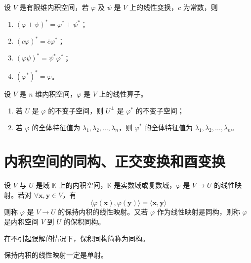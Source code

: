 \begin{theorem}
  设 $V$ 是有限维内积空间，若 $\varphi$ 及 $\psi$ 是 $V$ 上的线性变换，$c$ 为常数，则
  \begin{enumerate}
    \item $(\varphi + \psi)^* = \varphi^* + \psi^*$；
    \item $(c\varphi)^* = \overline{c}\varphi^*$；
    \item $(\varphi\psi)^* = \psi^{*}\varphi^{*}$；
    \item $(\varphi^*)^* = \varphi$。
  \end{enumerate}
\end{theorem}

\begin{proposition}
  设 $V$ 是 $n$ 维内积空间，$\varphi$ 是 $V$ 上的线性算子。
  \begin{enumerate}
    \item 若 $U$ 是 $\varphi$ 的不变子空间，则 $U^{\perp}$ 是 $\varphi^*$ 的不变子空间；
    \item 若 $\varphi$ 的全体特征值为 $\lambda_1, \lambda_2, \ldots, \lambda_n$，则 $\varphi^*$ 的全体特征值为 $\overline{\lambda}_1, \overline{\lambda}_2, \ldots, \overline{\lambda}_n$。
  \end{enumerate}
\end{proposition}



\section{内积空间的同构、正交变换和酉变换}

\begin{definition}
  设 $V$ 与 $U$ 是域 $\mathbb{K}$ 上的内积空间，$\mathbb{K}$ 是实数域或复数域，$\varphi$ 是 $V \to U$ 的线性映射。若对 $\forall \bm{x}, \bm{y} \in V$，有
  \[
      \langle \varphi(\bm{x}), \varphi(\bm{y}) \rangle = \langle \bm{x}, \bm{y} \rangle
  \]
  则称 $\varphi$ 是 $V \to U$ 的保持内积的线性映射。又若 $\varphi$ 作为线性映射是同构，则称 $\varphi$ 是内积空间 $V$ 到 $U$ 的保积同构。
\end{definition}

\begin{remark}
  在不引起误解的情况下，保积同构简称为同构。
\end{remark}

\begin{remark}
  保持内积的线性映射一定是单射。
\end{remark}

